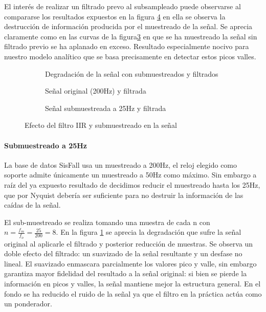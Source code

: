 El interés de realizar un filtrado prevo al subsampleado puede observarse al compararse los resultados expuestos en la figura \ref{fig:iir} en ella se observa la destrucción de información producida por el muestreado de la señal. Se aprecia claramente como en las curvas de la figura\ref{fig:signalIIRFilter25} en que se ha muestreado la señal sin filtrado previo se ha aplanado en exceso. Resultado especialmente nocivo para nuestro modelo analítico que se basa precisamente en detectar estos picos valles.

\begin{figure}[htb!]
  \centering
  \begin{subfigure}[b]{0.96\textwidth}
      \centering
      \caption{Degradación de la señal con submuestreados y filtrados}
      \label{fig:downsample}
  \end{subfigure}
  \centering

  \begin{subfigure}[b]{0.48\textwidth}
      \centering
      \caption{Señal original (200Hz) y filtrada}
      \label{fig:signalIIRFilter}
  \end{subfigure}
  \hfill
  \begin{subfigure}[b]{0.48\textwidth}
      \centering
      \caption{Señal submuestreada a 25Hz y filtrada}
      \label{fig:signalIIRFilter25}
  \end{subfigure}
  \caption{\label{fig:iir}  Efecto del filtro IIR y submuestreado en la señal}
\end{figure}

\paragraph{Submuestreado a 25Hz}

La base de datos SisFall usa un muestreado a 200Hz, el reloj elegido como soporte admite únicamente un muestreado a 50Hz como máximo. Sin embargo a raíz del ya expuesto resultado de  decidimos reducir el muestreado hasta los 25Hz, que por Nyquist debería ser suficiente para no destruir la información de las caídas de la señal.

El sub-muestreado se realiza tomando una muestra de cada n con $n=\frac{f_m}{f_o}=\frac{25}{200}=8$. En la figura \ref{fig:downsample} se aprecia la degradación que sufre la señal original al aplicarle el filtrado y posterior reducción de muestras. Se observa un doble efecto del filtrado: un suavizado de la señal resultante y un desfase no lineal. El suavizado enmascara parcialmente los valores pico y valle, sin embargo garantiza mayor fidelidad del resultado a la señal original: si bien se pierde la información en picos y valles, la señal mantiene mejor la estructura general. En el fondo se ha reducido el ruido de la señal ya que el filtro en la práctica actúa como un ponderador.

